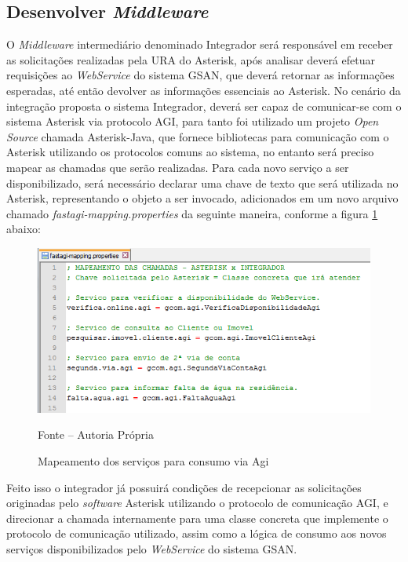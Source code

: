 \subsection{Desenvolver \textit{Middleware}}

O \textit{Middleware} intermediário denominado Integrador será responsável em receber as solicitações realizadas pela URA do Asterisk, após analisar deverá efetuar requisições ao \textit{WebService} do sistema GSAN, que deverá retornar as informações esperadas, até então devolver as informações essenciais ao Asterisk.
No cenário da integração proposta o sistema Integrador, deverá ser capaz de comunicar-se com o sistema Asterisk via protocolo AGI, para tanto foi utilizado um projeto \textit{Open Source} chamada Asterisk-Java, que fornece bibliotecas para comunicação com o Asterisk utilizando os protocolos comuns ao sistema, no entanto será preciso mapear as chamadas que serão realizadas.
Para cada novo serviço a ser disponibilizado, será necessário declarar uma chave de texto que será utilizada no Asterisk, representando o objeto a ser invocado, adicionados em um novo arquivo chamado \textit{fastagi-mapping.properties} da seguinte maneira, conforme a figura \ref{figura:mapeamenteServicosAGI} abaixo:

\begin{figure}[!htb]
	\centering
	\includegraphics{figuras/mapeamento_servicos_agi.png}
	\caption{Mapeamento dos serviços para consumo via Agi}
	\label{figura:mapeamenteServicosAGI}	
	Fonte – Autoria Própria
\end{figure}


Feito isso o integrador já possuirá condições de recepcionar as solicitações originadas pelo \textit{software} Asterisk utilizando o protocolo de comunicação AGI, e direcionar a chamada internamente para uma classe concreta que implemente o protocolo de comunicação utilizado, assim como a lógica de consumo aos novos serviços disponibilizados pelo \textit{WebService} do sistema GSAN.


